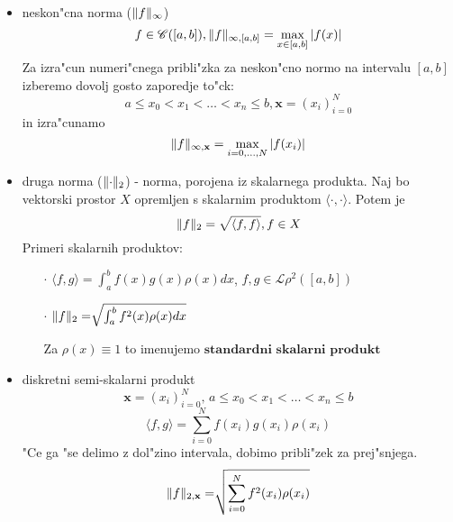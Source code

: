 \documentclass[a4paper,12pt]{article}
\DeclarePairedDelimiter\norm{\lVert}{\rVert}
\newcommand{\innerproduct}[2]{\langle #1, #2 \rangle}
\theoremstyle{definition}
\theoremstyle{remark}
\begin{document}
\begin{itemize}
    \item neskon"cna norma ($\norm{f}_{\infty}$)
    \begin{equation*}
        f \in \mathscr{C}([a, b]), \norm{f}_{\infty, [a, b]} = \max_{x \in [a, b]} \left| f(x) \right|
    \end{equation*}
    Za izra"cun numeri"cnega pribli"zka za neskon"cno normo na intervalu $[a, b]$ izberemo dovolj gosto zaporedje to"ck:
    \begin{equation*}
        a \leq x_0 < x_1 < \dots < x_n \leq b, \textbf{x} = (x_i)_{i=0}^N
    \end{equation*}
    in izra"cunamo
    \begin{equation*}
        \norm{f}_{\infty, \textbf{x}} = \max_{i = 0, \dots, N} \left| f(x_i) \right|
    \end{equation*}

    \item druga norma ($\norm{\cdot}_2$) - norma, porojena iz skalarnega produkta.
    Naj bo vektorski prostor $X$ opremljen s skalarnim produktom $\innerproduct{\cdot}{\cdot}$. Potem je 
    \begin{equation*}
        \norm{f}_2 = \sqrt{\innerproduct{f}{f}}, f \in X
    \end{equation*}
    Primeri skalarnih produktov:
    \begin{enumerate}
        \item[$\cdot$] $\innerproduct{f}{g} = \int_{a}^{b} f(x) g(x) \rho(x) dx$, $f, g \in \mathscr{L}{\rho}^2 ([a, b])$
        \item[$\cdot$] $\norm{f}_2 = \sqrt[]{\int_{a}^{b} f^2(x)\rho(x)dx }$
        
        Za $\rho(x) \equiv 1$ to imenujemo $\textbf{standardni skalarni produkt}$
    \end{enumerate}

    \item diskretni semi-skalarni produkt
    \begin{equation*}
        \textbf{x} = (x_i)_{i=0}^N \text{, }a \leq x_0 < x_1 < \dots < x_n \leq b
    \end{equation*}
    \begin{equation*}
        \innerproduct{f}{g} = \sum_{i = 0}^{N} f(x_i) g(x_i) \rho(x_i)
    \end{equation*}
    "Ce ga "se delimo z dol"zino intervala, dobimo pribli"zek za prej"snjega.
    \begin{equation*}
        \norm{f}_{2, \textbf{x}} = \sqrt[]{\sum_{i = 0}^{N} f^2(x_i)\rho(x_i)}
    \end{equation*}
\end{itemize}
\end{document}
